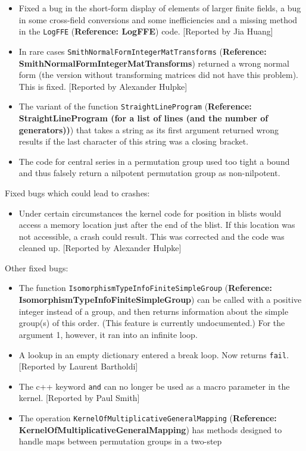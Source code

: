 \documentclass[a4paper,11pt]{report}
\begin{document}
{{\begin{itemize}
\item  Fixed a bug in the short-form display of elements of larger finite fields, a
bug in some cross-field conversions and some inefficiencies and a missing
method in the \texttt{LogFFE} (\textbf{Reference: LogFFE}) code. [Reported by Jia Huang] 
\item  In rare cases \texttt{SmithNormalFormIntegerMatTransforms} (\textbf{Reference: SmithNormalFormIntegerMatTransforms}) returned a wrong normal form (the version without transforming matrices did
not have this problem). This is fixed. [Reported by Alexander Hulpke] 
\item  The variant of the function \texttt{StraightLineProgram} (\textbf{Reference: StraightLineProgram (for a list of lines (and the number of generators))}) that takes a string as its first argument returned wrong results if the last
character of this string was a closing bracket. 
\item  The code for central series in a permutation group used too tight a bound and
thus falsely return a nilpotent permutation group as non-nilpotent. 
\end{itemize}
 Fixed bugs which could lead to crashes: 
\begin{itemize}
\item  Under certain circumstances the kernel code for position in blists would
access a memory location just after the end of the blist. If this location was
not accessible, a crash could result. This was corrected and the code was
cleaned up. [Reported by Alexander Hulpke] 
\end{itemize}
 Other fixed bugs: 
\begin{itemize}
\item  The function \texttt{IsomorphismTypeInfoFiniteSimpleGroup} (\textbf{Reference: IsomorphismTypeInfoFiniteSimpleGroup}) can be called with a positive integer instead of a group, and then returns
information about the simple group(s) of this order. (This feature is
currently undocumented.) For the argument 1, however, it ran into an infinite
loop. 
\item  A lookup in an empty dictionary entered a break loop. Now returns \texttt{fail}. [Reported by Laurent Bartholdi] 
\item  The c++ keyword \texttt{and} can no longer be used as a macro parameter in the kernel. [Reported by Paul
Smith] 
\item  The operation \texttt{KernelOfMultiplicativeGeneralMapping} (\textbf{Reference: KernelOfMultiplicativeGeneralMapping}) has methods designed to handle maps between permutation groups in a two-step

\end{itemize}}}
\end{document}
